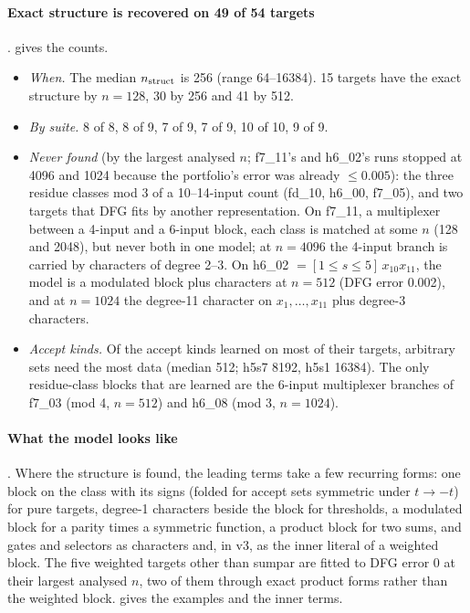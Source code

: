 \paragraph{Exact structure is recovered on 49 of 54 targets} .  gives the counts.
\begin{itemize}
\item \emph{When.} The median $n_{\rm struct}$ is 256 (range 64--16384). 15 targets have the exact structure by $n=128$, 30 by 256 and 41 by 512.
\item \emph{By suite.}  8 of 8,  8 of 9,  7 of 9,  7 of 9,  10 of 10,  9 of 9.
\item \emph{Never found} (by the largest analysed $n$; f7\_11's and h6\_02's runs stopped at 4096 and 1024 because the portfolio's error was already $\le0.005$): the three residue classes mod 3 of a 10--14-input count (fd\_10, h6\_00, f7\_05), and two targets that DFG fits by another representation. On f7\_11, a multiplexer between a 4-input and a 6-input block, each class is matched at some $n$ (128 and 2048), but never both in one model; at $n=4096$ the 4-input branch is carried by characters of degree 2--3. On h6\_02 $=[1\le s\le5]\,x_{10}x_{11}$, the model is a modulated block plus characters at $n=512$ (DFG error 0.002), and at $n=1024$ the degree-11 character on $x_1,\dots,x_{11}$ plus degree-3 characters.
\item \emph{Accept kinds.} Of the accept kinds learned on most of their targets, arbitrary sets need the most data (median 512; h5s7 8192, h5s1 16384). The only residue-class blocks that are learned are the 6-input multiplexer branches of f7\_03 (mod 4, $n=512$) and h6\_08 (mod 3, $n=1024$).
\end{itemize}

\paragraph{What the model looks like} . Where the structure is found, the leading terms take a few recurring forms: one block on the class with its signs (folded for accept sets symmetric under $t\to-t$) for pure targets, degree-1 characters beside the block for thresholds, a modulated block for a parity times a symmetric function, a product block for two sums, and gates and selectors as characters and, in v3, as the inner literal of a weighted block. The five weighted targets other than sumpar are fitted to DFG error 0 at their largest analysed $n$, two of them through exact product forms rather than the weighted block.  gives the examples and the inner terms.


